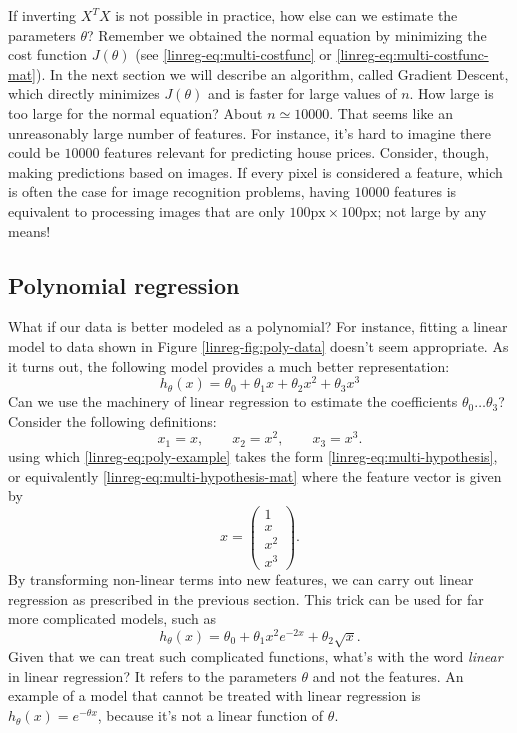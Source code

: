 \documentclass{article}
\theoremstyle{definition}
\begin{document}
If inverting $X^TX$ is not possible in practice, how else can we estimate the parameters $\theta$? Remember we obtained the normal equation by minimizing the cost function $J(\theta)$ (see \eqref{linreg-eq:multi-costfunc} or \eqref{linreg-eq:multi-costfunc-mat}). In the next section we will describe an algorithm, called Gradient Descent, which directly minimizes $J(\theta)$ and is faster for large values of $n$. How large is too large for the normal equation? About $n\simeq10000$. That seems like an unreasonably large number of features. For instance, it's hard to imagine there could be $10000$ features relevant for predicting house prices. Consider, though, making predictions based on images. If every pixel is considered a feature, which is often the case for image recognition problems, having $10000$ features is equivalent to processing images that are only $100\text{px}\times100\text{px}$; not large by any means!


\subsection{Polynomial regression}
What if our data is better modeled as a polynomial? For instance, fitting a linear model to data shown in Figure \ref{linreg-fig:poly-data} doesn't seem appropriate. As it turns out, the following model provides a much better representation:
\begin{equation}
h_\theta(x) = \theta_0 + \theta_1 x + \theta_2 x^2 + \theta_3 x^3
\label{linreg-eq:poly-example}
\end{equation}
Can we use the machinery of linear regression to estimate the coefficients $\theta_0\dots\theta_3$? Consider the following definitions:
\begin{equation}
    x_1 = x, \qquad x_2 = x^2, \qquad x_3 = x^3.
\end{equation}
using which \eqref{linreg-eq:poly-example} takes the form \eqref{linreg-eq:multi-hypothesis}, or equivalently \eqref{linreg-eq:multi-hypothesis-mat} where the feature vector is given by
\begin{equation}
    x=
    \begin{pmatrix}
        1 \\
        x \\
        x^2 \\
        x^3
    \end{pmatrix}.
\end{equation}
By transforming non-linear terms into new features, we can carry out linear regression as prescribed in the previous section. This trick can be used for far more complicated models, such as
\begin{equation}
    h_{\theta}(x) = \theta_0 + \theta_1 x^2 e^{-2x} + \theta_2 \sqrt{x}.
\end{equation}
Given that we can treat such complicated functions, what's with the word \textit{linear} in linear regression? It refers to the parameters $\theta$ and not the features. An example of a model that cannot be treated with linear regression is $h_{\theta}(x) = e^{-\theta x}$, because it's not a linear function of $\theta$.
\end{document}
